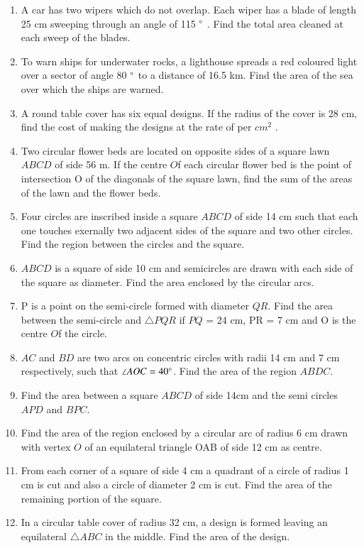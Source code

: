 \begin{enumerate}[label=\thesection.\arabic*.,ref=\thesection.\theenumi]
\item A car has two wipers which do not overlap. Each wiper has a blade of length 25 cm sweeping through an angle of 115 $\degree$ . Find the total area cleaned at each sweep of the blades.
\item  To warn ships for underwater rocks, a lighthouse spreads a red coloured light over a sector of angle 80 $\degree$  to a distance of 16.5 km. Find the area of the sea over which the ships are warned.
\item  A round table cover has six equal designs. If the radius of the cover is 28 cm, find the cost of making the designs at the rate of  per $cm^2$
. 
%
\item Two circular flower beds are located on opposite sides of a square lawn $ABCD$ of side 56 m. If the centre $O$f each circular flower bed is the point of intersection O of the diagonals of the square lawn, find the sum of the areas of the lawn and the flower beds.
%
\item Four circles are inscribed  inside a square $ABCD$ of side 14 cm such that each one touches exernally two adjacent sides of the square and two  other circles.  Find the region between the circles and the square.
\item  $ABCD$ is a square of side 10 cm and semicircles are drawn with each side of the square as diameter. Find the area enclosed by the circular arcs.
%
\item P is a point on the semi-circle formed with diameter $QR$. Find the area between the semi-circle and $\triangle PQR$ if $PQ$ = 24 cm, PR = 7 cm and O is the centre $O$f the circle.
\item $AC$ and $BD$ are two arcs on concentric circles with radii 14 cm and 7 cm respectively, such that $\angle AOC = 40\degree$.  Find the area of the region $ABDC$.
%
\item Find the area between a square $ABCD$ of side 14cm and the semi circles $APD$ and $BPC$.
\item Find the area of the  region enclosed by  a circular arc of radius 6 cm drawn with vertex $O$ of an equilateral triangle OAB of side 12 cm as centre.
%
\item From each corner of a square of side 4 cm a quadrant of a circle of radius 1 cm is cut and also a circle of diameter 2 cm is cut. Find the area of the remaining portion of the square.\item In a circular table cover of radius 32 cm, a design is formed leaving an equilateral $\triangle ABC$ in the middle. Find the area of the design.

\end{enumerate}
